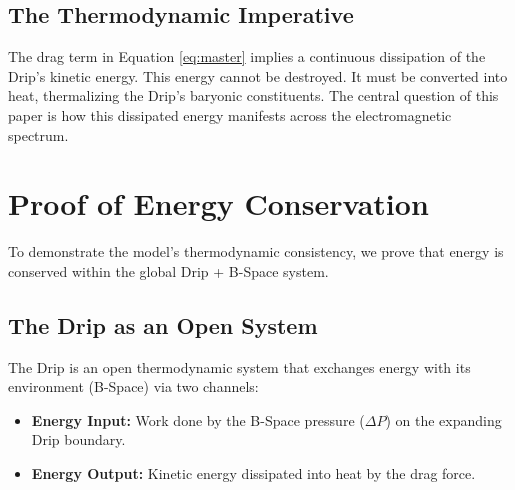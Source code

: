 \documentclass{BSpacePaper} %
\begin{document}
\subsection{The Thermodynamic Imperative}
The drag term in Equation \ref{eq:master} implies a continuous dissipation of the Drip's kinetic energy. This energy cannot be destroyed. It must be converted into heat, thermalizing the Drip's baryonic constituents. The central question of this paper is how this dissipated energy manifests across the electromagnetic spectrum.

\section{Proof of Energy Conservation}
To demonstrate the model's thermodynamic consistency, we prove that energy is conserved within the global Drip + B-Space system.

\subsection{The Drip as an Open System}
The Drip is an open thermodynamic system that exchanges energy with its environment (B-Space) via two channels:
\begin{itemize}
    \item \textbf{Energy Input:} Work done by the B-Space pressure ($\Delta P$) on the expanding Drip boundary.
    \item \textbf{Energy Output:} Kinetic energy dissipated into heat by the drag force.
\end{itemize}
\end{document}
